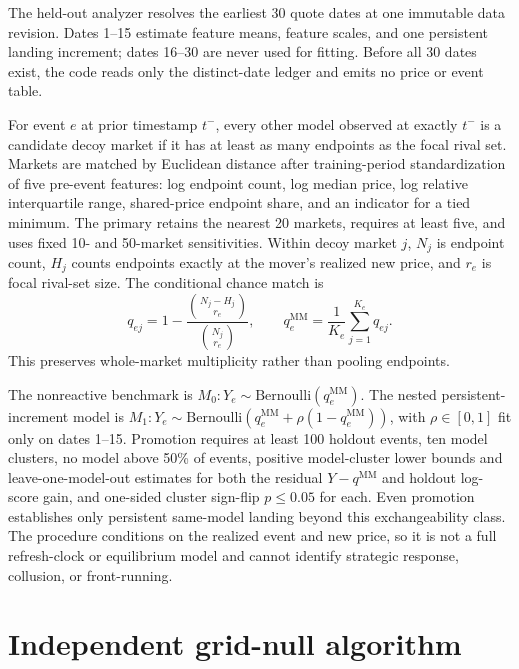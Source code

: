 \documentclass[11pt]{article}
\newcommand{\1}{\mathbf{1}}
\begin{document}
The held-out analyzer resolves the earliest 30 quote dates at one immutable data
revision.  Dates 1--15 estimate feature means, feature scales, and one persistent
landing increment; dates 16--30 are never used for fitting.  Before all 30 dates
exist, the code reads only the distinct-date ledger and emits no price or event
table.

For event $e$ at prior timestamp $t^-$, every other model observed at exactly
$t^-$ is a candidate decoy market if it has at least as many endpoints as the
focal rival set.  Markets are matched by Euclidean distance after training-period
standardization of five pre-event features: log endpoint count, log median price,
log relative interquartile range, shared-price endpoint share, and an indicator
for a tied minimum.  The primary retains the nearest 20 markets, requires at least
five, and uses fixed 10- and 50-market sensitivities.  Within decoy market $j$,
$N_j$ is endpoint count, $H_j$ counts endpoints exactly at the mover's realized
new price, and $r_e$ is focal rival-set size.  The conditional chance match is
\begin{equation}
 q_{ej}=1-\frac{\binom{N_j-H_j}{r_e}}{\binom{N_j}{r_e}},
 \qquad q_e^{\mathrm{MM}}=\frac{1}{K_e}\sum_{j=1}^{K_e}q_{ej}.
\end{equation}
This preserves whole-market multiplicity rather than pooling endpoints.

The nonreactive benchmark is $M_0:Y_e\sim\mathrm{Bernoulli}(q_e^{\mathrm{MM}})$.
The nested persistent-increment model is
$M_1:Y_e\sim\mathrm{Bernoulli}(q_e^{\mathrm{MM}}+\rho(1-q_e^{\mathrm{MM}}))$,
with $\rho\in[0,1]$ fit only on dates 1--15.  Promotion requires at least 100
holdout events, ten model clusters, no model above 50\% of events, positive
model-cluster lower bounds and leave-one-model-out estimates for both the residual
$Y-q^{\mathrm{MM}}$ and holdout log-score gain, and one-sided cluster sign-flip
$p\leq0.05$ for each.  Even promotion establishes only persistent same-model
landing beyond this exchangeability class.  The procedure conditions on the
realized event and new price, so it is not a full refresh-clock or equilibrium
model and cannot identify strategic response, collusion, or front-running.

\section{Independent grid-null algorithm}
\label{app:gridnull}
\end{document}
